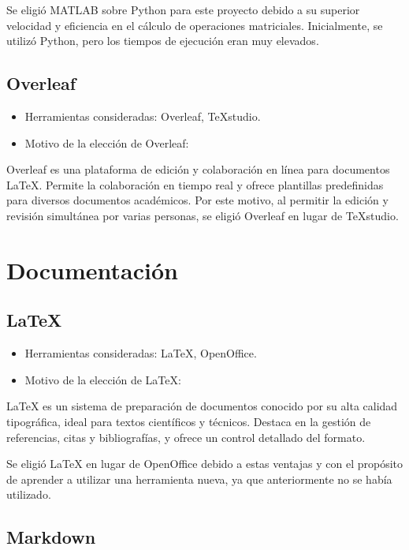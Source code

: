 Se eligió MATLAB sobre Python para este proyecto debido a su superior velocidad y eficiencia en el cálculo de operaciones matriciales. Inicialmente, se utilizó Python, pero los tiempos de ejecución eran muy elevados.

\subsection{Overleaf}\label{overleaf}

\begin{itemize}
    \item Herramientas consideradas: Overleaf, TeXstudio.
    \item Motivo de la elección de Overleaf:
\end{itemize}

Overleaf es una plataforma de edición y colaboración en línea para documentos LaTeX. Permite la colaboración en tiempo real y ofrece plantillas predefinidas para diversos documentos académicos. Por este motivo, al permitir la edición y revisión simultánea por varias personas, se eligió Overleaf en lugar de TeXstudio.

\section{Documentación}\label{documentación}

\subsection{LaTeX}\label{latex}

\begin{itemize}
    \item Herramientas consideradas: LaTeX, OpenOffice.
    \item Motivo de la elección de LaTeX:
\end{itemize}

LaTeX es un sistema de preparación de documentos conocido por su alta calidad tipográfica, ideal para textos científicos y técnicos. Destaca en la gestión de referencias, citas y bibliografías, y ofrece un control detallado del formato.

Se eligió LaTeX en lugar de OpenOffice debido a estas ventajas y con el propósito de aprender a utilizar una herramienta nueva, ya que anteriormente no se había utilizado.

\subsection{Markdown}\label{markdown}

